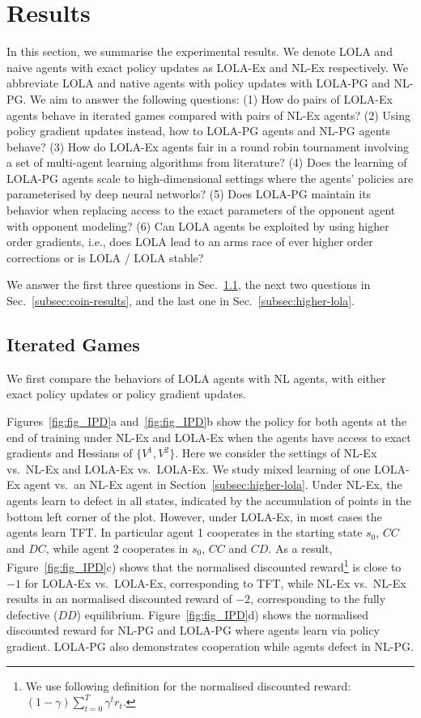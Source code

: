 


\section{Results}
In this section, we summarise the experimental results. We denote LOLA and naive agents with exact policy updates as LOLA-Ex and NL-Ex respectively. We abbreviate LOLA and native agents with policy updates with LOLA-PG and NL-PG. We aim to answer the following questions:
(1) How do pairs of LOLA-Ex agents behave in iterated games compared with pairs of NL-Ex agents? 
(2) Using policy gradient updates instead, how to LOLA-PG agents and NL-PG agents behave?
(3) How do LOLA-Ex agents fair in a round robin tournament involving a set of multi-agent learning algorithms from literature?
(4) Does the learning of LOLA-PG agents scale to high-dimensional settings where the agents' policies are parameterised by deep neural networks?
(5) Does LOLA-PG maintain its behavior when replacing access to the exact parameters of the opponent agent with opponent modeling?
(6) Can LOLA agents be exploited by using higher order gradients, i.e., does LOLA lead to an arms race of ever higher order corrections or is LOLA / LOLA stable?

We answer the first three questions in Sec.~\ref{subsec:iterated-results}, the next two questions in Sec.~\ref{subsec:coin-results}, and the last one in Sec.~\ref{subsec:higher-lola}.




\subsection{Iterated Games}
\label{subsec:iterated-results}
We first compare the behaviors of LOLA agents with NL agents, with either exact policy updates or policy gradient updates.

Figures~\ref{fig:fig_IPD}a and~\ref{fig:fig_IPD}b show the policy for both agents at the end of training under NL-Ex and LOLA-Ex when the agents have access to exact gradients and Hessians of $\{V^1, V^2\}$. Here we consider the settings of NL-Ex vs.\ NL-Ex and LOLA-Ex vs.\ LOLA-Ex. We study mixed learning of one LOLA-Ex agent vs.\ an NL-Ex agent in Section~\ref{subsec:higher-lola}. Under NL-Ex, the agents learn to defect in all states, indicated by the accumulation of points in the bottom left corner of the plot. However, under LOLA-Ex, in most cases the agents learn TFT. In particular agent 1 cooperates in the starting state $s_0$, $CC$ and $DC$, while agent 2 cooperates in $s_0$, $CC$ and $CD$. As a result, Figure~\ref{fig:fig_IPD}c) shows that the normalised discounted reward\footnote{We use following definition for the normalised discounted reward:  $ (1 - \gamma) \sum_{t=0}^T \gamma^t r_t $.} is close to $-1$ for LOLA-Ex vs.\ LOLA-Ex, corresponding to TFT, while NL-Ex vs.\ NL-Ex results in an normalised discounted reward of $-2$, corresponding to the fully defective ($DD$) equilibrium. Figure~\ref{fig:fig_IPD}d) shows the normalised discounted reward for NL-PG and LOLA-PG where agents learn via policy gradient. LOLA-PG also demonstrates cooperation while agents defect in NL-PG.

